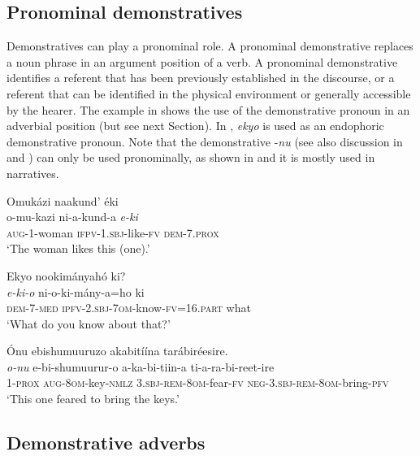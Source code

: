 \documentclass[output=paper 		  ]{langscibook}
\begin{document}
\subsection{Pronominal demonstratives}\label{sec:asiimwe:3.4}

Demonstratives can play a pronominal role. A pronominal demonstrative replaces a noun phrase in an argument position of a verb. A pronominal demonstrative identifies a referent that has been previously established in the discourse, or a referent that can be identified in the physical environment  or generally accessible by the hearer. The example in  shows the use of the demonstrative pronoun in an adverbial position (but see next Section). In , \textit{ekyo} is used as an endophoric demonstrative pronoun. Note that the demonstrative -\textit{nu} (see also discussion in  and ) can only be used pronominally, as shown in  and it is mostly used in narratives.

\ea%
    \label{ex:asiimwe:39}
    Omukázi naakund’ éki\\
  \gll o-mu-kazi  ni-a-kund-a  \emph{e-ki}\\
  \textsc{aug}{}-1-woman  \textsc{ifpv-1.sbj}{}-like-\textsc{fv}  \textsc{dem}{}-7.\textsc{prox}\\
\glt ‘The woman likes this (one).’

\ex \label{ex:asiimwe:40}  Ekyo nookimányahó ki?\\
\gll \emph{e-ki-o}  ni-o-ki-mány-a=ho  ki\\
\textsc{dem-7-med}  \textsc{ipfv-2.sbj-7om-}know-\textsc{fv=16.part}  what\\
\glt ‘What do you know about that?’

\ex\label{ex:asiimwe:41}
   Ónu ebishumuuruzo akabitíína tarábiréesire.\\
\gll \emph{o-nu}  e-bi-shumuurur-o  a-ka-bi-tiin-a  ti-a-ra-bi-reet-ire\\
1-\textsc{prox}  \textsc{aug-}\textsc{8om}-key-\textsc{nmlz}  \textsc{3.sbj-rem-}\textsc{8om}-fear-\textsc{fv}  \textsc{neg-3.sbj-rem-}\textsc{8om}-bring-\textsc{pfv}\\ 
\glt ‘This one feared to bring the keys.’
\z

\subsection{Demonstrative adverbs}\label{sec:asiimwe:3.5}
\end{document}
